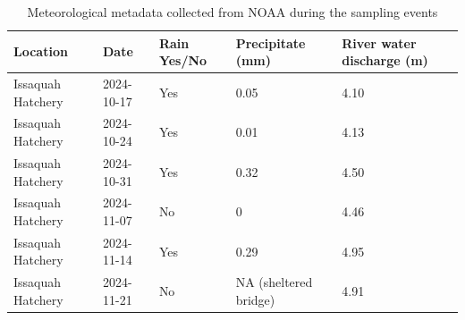 \documentclass{article}
\begin{document}
\begin{table}
    \centering
    \renewcommand{\thetable}{S2}
    \begin{tabular}{lllll}
    \textbf{Location} & \textbf{Date} & \textbf{Rain Yes/No} & \textbf{Precipitate (mm)} & \textbf{River water discharge (m)}\\
    \hline
    Issaquah Hatchery & 2024-10-17 & Yes & 0.05 & 4.10 \\
    Issaquah Hatchery & 2024-10-24 & Yes & 0.01 & 4.13 \\
    Issaquah Hatchery & 2024-10-31 & Yes & 0.32 & 4.50 \\
    Issaquah Hatchery & 2024-11-07 & No  & 0    & 4.46 \\
    Issaquah Hatchery & 2024-11-14 & Yes & 0.29 & 4.95 \\
    Issaquah Hatchery & 2024-11-21 & No  & NA (sheltered bridge) & 4.91 \\
    \hline
    \end{tabular}
    \caption{Meteorological metadata collected from NOAA during the sampling events}
\end{table}
\addtocounter{table}{-1}
\end{document}
